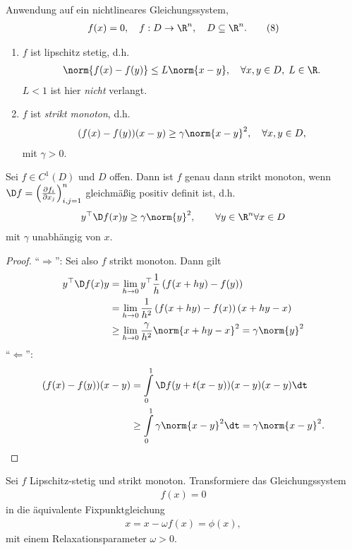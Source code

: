 Anwendung auf ein nichtlineares Gleichungssystem,
\begin{align*}
f(x) = 0,\quad f: D\to\R^n,\quad D\subseteq \R^n.\tag{8}
\end{align*}
\begin{bemn}[Annahmen an $f$.]
\begin{enumerate}[label=(\roman{*})]
  \item $f$ ist lipschitz stetig, d.h.
\begin{align*}
\norm{f(x)-f(y)} \le L\norm{x-y},\quad\forall x,y\in D,\; L\in\R.
\end{align*}
$L<1$ ist hier \textit{nicht} verlangt.
\item $f$ ist \emph{strikt monoton}, d.h.
\begin{align*}
(f(x)-f(y))(x-y) \ge \gamma\norm{x-y}^2,\quad\forall x,y\in D,
\end{align*}
mit $\gamma > 0$.
\end{enumerate}
\end{bemn}

\begin{lemn}
Sei $f\in C^1(D)$ und $D$ offen. Dann ist $f$ genau dann strikt monoton, wenn 
$\D f = \left(\frac{\partial f_i}{\partial x_j}\right)_{i,j=1}^n$ gleichmäßig
positiv definit ist, d.h.
\begin{align*}
y^\top \D f(x) y \ge \gamma \norm{y}^2,\qquad \forall y\in \R^n\forall x\in D
\end{align*}
mit $\gamma$ unabhängig von $x$.\fishhere
\end{lemn}
\begin{proof}
``$\Rightarrow$'': Sei also $f$ strikt monoton. Dann gilt
\begin{align*}
y^\top \D f(x) y &= \lim\limits_{h\to 0} y^\top \frac{1}{h}\left(f(x+h y) - f(y)
\right) \\ &= \lim\limits_{h\to 0}
\frac{1}{h^2}\left(f(x+hy) - f(x) \right)(x+hy-x)\\
&\ge \lim\limits_{h\to 0}
\frac{\gamma}{h^2}\norm{x+hy-x}^2
= 
\gamma\norm{y}^2
\end{align*}
``$\Leftarrow$'': 
\begin{align*}
(f(x)-f(y))(x-y) &= \int\limits_0^1 \D f(y+t(x-y))(x-y)(x-y)\dt
\\ &\ge \int\limits_0^1 \gamma\norm{x-y}^2 \dt = \gamma\norm{x-y}^2.\qedhere
\end{align*} 
\end{proof}

Sei $f$ Lipschitz-stetig und strikt monoton. Transformiere das Gleichungssystem
\begin{align*}
f(x) = 0
\end{align*}
in die äquivalente Fixpunktgleichung
\begin{align*}
x = x-\omega f(x) = \phi(x),
\end{align*}
mit einem Relaxationsparameter $\omega > 0$.

